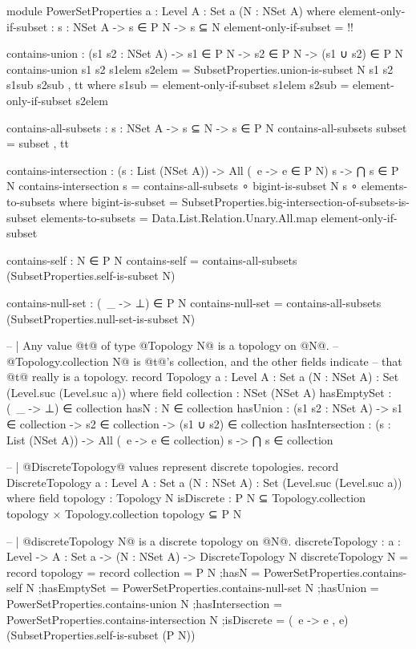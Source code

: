 \begin{code}
module PowerSetProperties {a : Level} {A : Set a} (N : NSet A) where
  element-only-if-subset : {s : NSet A} -> s ∈ P N -> s ⊆ N
  element-only-if-subset = {!!}

  contains-union : (s1 s2 : NSet A) -> s1 ∈ P N -> s2 ∈ P N -> (s1 ∪ s2) ∈ P N
  contains-union s1 s2 s1elem s2elem =
    SubsetProperties.union-is-subset N s1 s2 s1sub s2sub , tt
    where
      s1sub = element-only-if-subset s1elem
      s2sub = element-only-if-subset s2elem

  contains-all-subsets : {s : NSet A} -> s ⊆ N -> s ∈ P N
  contains-all-subsets subset = subset , tt

  contains-intersection : (s : List (NSet A)) ->
                          All (\ e -> e ∈ P N) s ->
                          ⋂ s ∈ P N
  contains-intersection s = contains-all-subsets ∘ bigint-is-subset N s ∘ elements-to-subsets
    where
    bigint-is-subset = SubsetProperties.big-intersection-of-subsets-is-subset
    elements-to-subsets = Data.List.Relation.Unary.All.map element-only-if-subset

  contains-self : N ∈ P N
  contains-self = contains-all-subsets (SubsetProperties.self-is-subset N)

  contains-null-set : (\ _ -> ⊥) ∈ P N
  contains-null-set = contains-all-subsets (SubsetProperties.null-set-is-subset N)

-- | Any value @t@ of type @Topology N@ is a topology on @N@.
-- @Topology.collection N@ is @t@'s collection, and the other fields indicate
-- that @t@ really is a topology.
record Topology {a : Level}
                {A : Set a}
                (N : NSet A) : Set (Level.suc (Level.suc a)) where
  field
    collection : NSet (NSet A)
    hasEmptySet : (\ _ -> ⊥) ∈ collection
    hasN : N ∈ collection
    hasUnion : (s1 s2 : NSet A) ->
               s1 ∈ collection ->
               s2 ∈ collection ->
               (s1 ∪ s2) ∈ collection
    hasIntersection : (s : List (NSet A)) ->
                      All (\ e -> e ∈ collection) s ->
                      ⋂ s ∈ collection

-- | @DiscreteTopology@ values represent discrete topologies.
record DiscreteTopology {a : Level}
                        {A : Set a}
                        (N : NSet A) : Set (Level.suc (Level.suc a)) where
  field
    topology : Topology N
    isDiscrete : P N ⊆ Topology.collection topology ×
                 Topology.collection topology ⊆ P N

-- | @discreteTopology N@ is a discrete topology on @N@.
discreteTopology : {a : Level} -> {A : Set a} -> (N : NSet A) -> DiscreteTopology N
discreteTopology N = record
  {topology = record
     {collection = P N
     ;hasN = PowerSetProperties.contains-self N
     ;hasEmptySet = PowerSetProperties.contains-null-set N
     ;hasUnion = PowerSetProperties.contains-union N
     ;hasIntersection = PowerSetProperties.contains-intersection N
     }
  ;isDiscrete = (\ e -> e , e) (SubsetProperties.self-is-subset (P N))}


\end{code}
